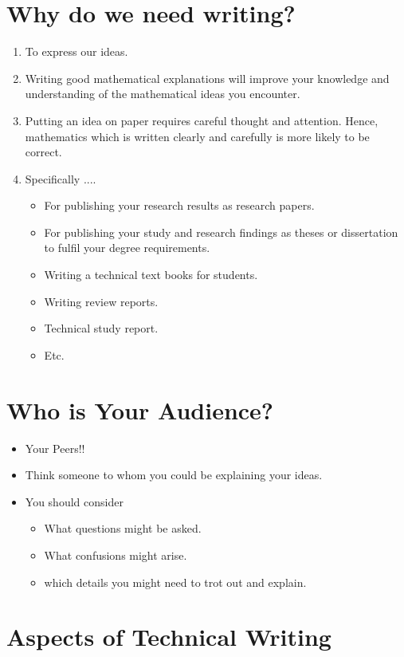 \documentclass[]{report}
\begin{document}
  \section{Why do we need writing?}
  \begin{enumerate}
  \item To express our ideas.
  \item Writing good mathematical explanations will improve your
knowledge and understanding of the mathematical ideas you
encounter.
\item Putting an idea on paper requires careful thought and attention.
Hence, mathematics which is written clearly and carefully is
more likely to be correct.
\item Specifically ....
\begin{itemize}
\item For publishing your research results as research papers.
\item For publishing your study and research findings as theses
or dissertation to fulfil your degree requirements.
\item Writing a technical text books for students.
\item Writing review reports.
\item Technical study report.
\item Etc.
\end{itemize}
  \end{enumerate}
  
  \section{Who is Your Audience?}
   \begin{itemize}
   \item Your Peers!!
   \item Think someone to whom you could be explaining your ideas.
   \item You should consider
   \begin{itemize}
   \item What questions might be asked.
   \item What confusions might arise.
   \item which details you might need to trot out and explain.
   \end{itemize}
  \end{itemize}
  
  
  \section{Aspects of Technical Writing}
\end{document}
